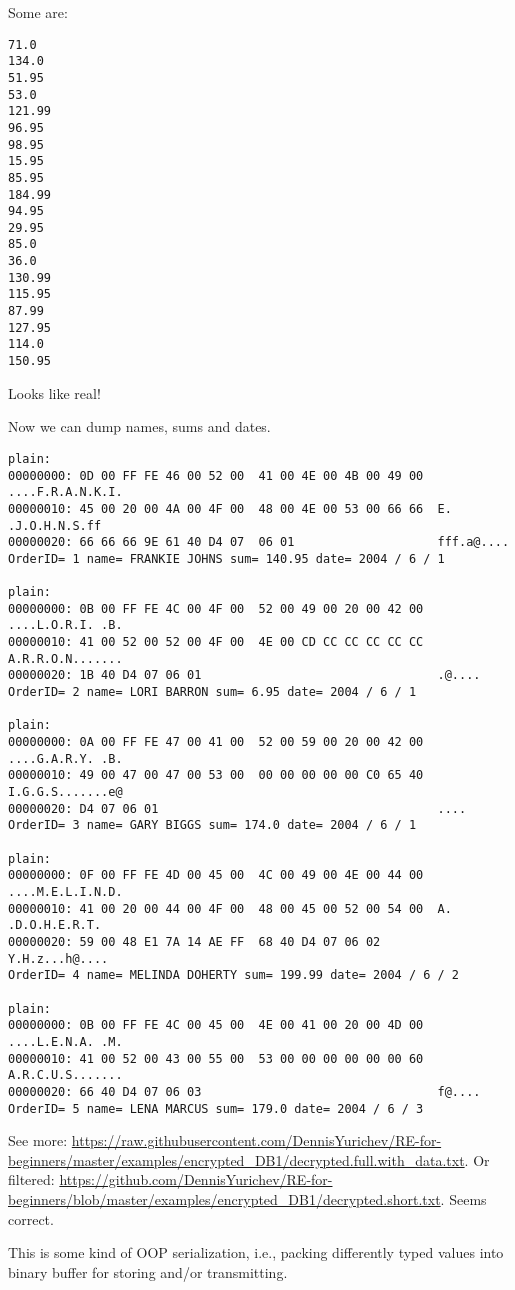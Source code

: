 Some are:

\begin{lstlisting}
71.0
134.0
51.95
53.0
121.99
96.95
98.95
15.95
85.95
184.99
94.95
29.95
85.0
36.0
130.99
115.95
87.99
127.95
114.0
150.95
\end{lstlisting}

Looks like real!

Now we can dump names, sums and dates.

\begin{lstlisting}
plain:
00000000: 0D 00 FF FE 46 00 52 00  41 00 4E 00 4B 00 49 00  ....F.R.A.N.K.I.
00000010: 45 00 20 00 4A 00 4F 00  48 00 4E 00 53 00 66 66  E. .J.O.H.N.S.ff
00000020: 66 66 66 9E 61 40 D4 07  06 01                    fff.a@....
OrderID= 1 name= FRANKIE JOHNS sum= 140.95 date= 2004 / 6 / 1

plain:
00000000: 0B 00 FF FE 4C 00 4F 00  52 00 49 00 20 00 42 00  ....L.O.R.I. .B.
00000010: 41 00 52 00 52 00 4F 00  4E 00 CD CC CC CC CC CC  A.R.R.O.N.......
00000020: 1B 40 D4 07 06 01                                 .@....
OrderID= 2 name= LORI BARRON sum= 6.95 date= 2004 / 6 / 1

plain:
00000000: 0A 00 FF FE 47 00 41 00  52 00 59 00 20 00 42 00  ....G.A.R.Y. .B.
00000010: 49 00 47 00 47 00 53 00  00 00 00 00 00 C0 65 40  I.G.G.S.......e@
00000020: D4 07 06 01                                       ....
OrderID= 3 name= GARY BIGGS sum= 174.0 date= 2004 / 6 / 1

plain:
00000000: 0F 00 FF FE 4D 00 45 00  4C 00 49 00 4E 00 44 00  ....M.E.L.I.N.D.
00000010: 41 00 20 00 44 00 4F 00  48 00 45 00 52 00 54 00  A. .D.O.H.E.R.T.
00000020: 59 00 48 E1 7A 14 AE FF  68 40 D4 07 06 02        Y.H.z...h@....
OrderID= 4 name= MELINDA DOHERTY sum= 199.99 date= 2004 / 6 / 2

plain:
00000000: 0B 00 FF FE 4C 00 45 00  4E 00 41 00 20 00 4D 00  ....L.E.N.A. .M.
00000010: 41 00 52 00 43 00 55 00  53 00 00 00 00 00 00 60  A.R.C.U.S.......
00000020: 66 40 D4 07 06 03                                 f@....
OrderID= 5 name= LENA MARCUS sum= 179.0 date= 2004 / 6 / 3
\end{lstlisting}

See more: \url{https://raw.githubusercontent.com/DennisYurichev/RE-for-beginners/master/examples/encrypted_DB1/decrypted.full.with_data.txt}.
Or filtered: \url{https://github.com/DennisYurichev/RE-for-beginners/blob/master/examples/encrypted_DB1/decrypted.short.txt}.
Seems correct.

This is some kind of \ac{OOP} serialization, i.e., packing differently typed values into binary buffer for storing and/or transmitting.

